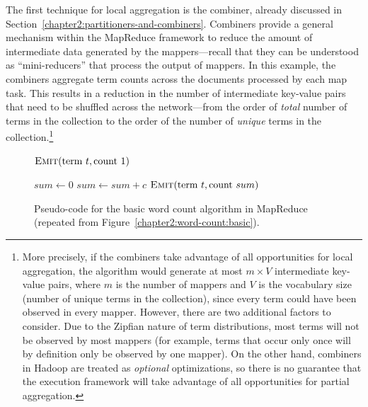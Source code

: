 The first technique for local aggregation is the combiner, already
discussed in Section~\ref{chapter2:partitioners-and-combiners}.
Combiners provide a general mechanism within the MapReduce framework
to reduce the amount of intermediate data generated by the
mappers---recall that they can be understood as ``mini-reducers'' that
process the output of mappers.  In this example, the combiners
aggregate term counts across the documents processed by each map task.
This results in a reduction in the number of intermediate key-value
pairs that need to be shuffled across the network---from the order of
\emph{total} number of terms in the collection to the order of the
number of \emph{unique} terms in the collection.\footnote{More
  precisely, if the combiners take advantage of all opportunities for
  local aggregation, the algorithm would generate at most $m \times V$
  intermediate key-value pairs, where $m$ is the number of mappers and
  $V$ is the vocabulary size (number of unique terms in the
  collection), since every term could have been observed in every
  mapper.  However, there are two additional factors to consider.  Due
  to the Zipfian nature of term distributions, most terms will not be
  observed by most mappers (for example, terms that occur only once
  will by definition only be observed by one mapper).  On the other
  hand, combiners in Hadoop are treated as \emph{optional}
  optimizations, so there is no guarantee that the execution framework
  will take advantage of all opportunities for partial aggregation.}

\begin{figure}[t]
\algrenewcommand{}
\algrenewcommand{}
  \begin{algorithmic}[1]
    \State $\textsc{Emit}(\textrm{term }t, \textrm{count }1)$
    \EndFor
    \EndProcedure
    \EndFunction
  \end{algorithmic}

  \begin{algorithmic}[1]
    \State $sum \gets 0$
    \State $sum \gets sum + c$
    \EndFor
    \State $\textsc{Emit}(\textrm{term }t, \textrm{count }sum)$
    \EndProcedure
    \EndFunction
  \end{algorithmic}
  \caption{Pseudo-code for the basic word count algorithm in MapReduce
    (repeated from Figure~\ref{chapter2:word-count:basic}).}
\label{figure:chapter3:word-count:basic}
\end{figure}

